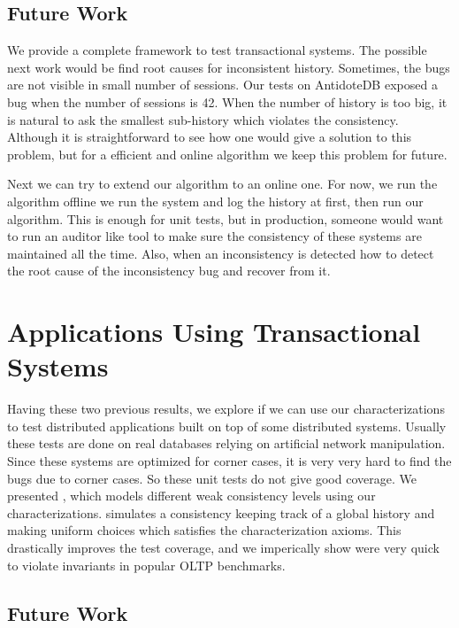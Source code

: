\subsection{Future Work}

We provide a complete framework to test transactional systems. The possible next work would be find root causes for inconsistent history. Sometimes, the bugs are not visible in small number of sessions. Our tests on AntidoteDB exposed a bug when the number of sessions is 42. When the number of history is too big, it is natural to ask the smallest sub-history which violates the consistency. Although it is straightforward to see how one would give a solution to this problem, but for a efficient and online algorithm we keep this problem for future.

Next we can try to extend our algorithm to an online one. For now, we run the algorithm offline \ie we run the system and log the history at first, then run our algorithm. This is enough for unit tests, but in production, someone would want to run an auditor like tool to make sure the consistency of these systems are maintained all the time. Also, when an inconsistency is detected how to detect the root cause of the inconsistency bug and recover from it. 

\section{Applications Using Transactional Systems}

Having these two previous results, we explore if we can use our characterizations to test distributed applications built on top of some distributed systems. Usually these tests are done on real databases relying on artificial network manipulation. Since these systems are optimized for corner cases, it is very very hard to find the bugs due to corner cases. So these unit tests do not give good coverage. We presented \tool{}, which models different weak consistency levels using our characterizations. \tool{} simulates a consistency keeping track of a global history and making uniform choices which satisfies the characterization axioms. This drastically improves the test coverage, and we imperically show \tool{} were very quick to violate invariants in popular OLTP benchmarks.

\subsection{Future Work}

